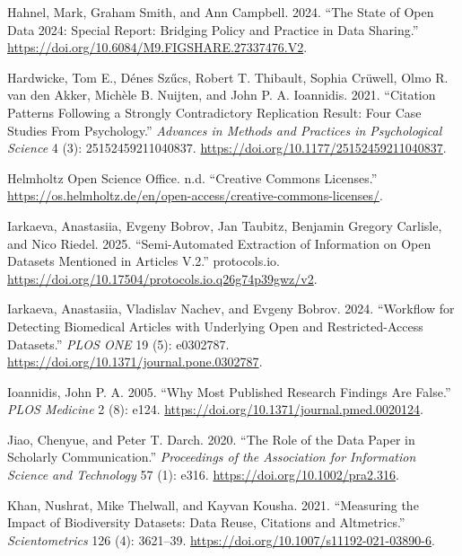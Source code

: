 \documentclass[
  letterpaper,
  DIV=11,
  numbers=noendperiod]{scrartcl}
\newlength{\cslhangindent}
\newenvironment{CSLReferences}[2] %
 {\begin{list}{}{%
  \setlength{\itemindent}{0pt}
  \setlength{\leftmargin}{0pt}
  \setlength{\parsep}{0pt}
  \ifodd #1
   \setlength{\leftmargin}{\cslhangindent}
   \setlength{\itemindent}{-1\cslhangindent}
  \fi
  \setlength{\itemsep}{#2\baselineskip}}}
 {\end{list}}
\begin{document}
\begin{CSLReferences}{1}{0}
Hahnel, Mark, Graham Smith, and Ann Campbell. 2024. {``{The State of
Open Data 2024: Special Report}: Bridging Policy and Practice in Data
Sharing.''} \url{https://doi.org/10.6084/M9.FIGSHARE.27337476.V2}.

Hardwicke, Tom E., Dénes Szűcs, Robert T. Thibault, Sophia Crüwell, Olmo
R. van den Akker, Michèle B. Nuijten, and John P. A. Ioannidis. 2021.
{``Citation {Patterns Following} a {Strongly Contradictory Replication
Result}: {Four Case Studies From Psychology}.''} \emph{Advances in
Methods and Practices in Psychological Science} 4 (3):
25152459211040837. \url{https://doi.org/10.1177/25152459211040837}.

Helmholtz Open Science Office. n.d. {``Creative {Commons Licenses}.''}
\url{https://os.helmholtz.de/en/open-access/creative-commons-licenses/}.

Iarkaeva, Anastasiia, Evgeny Bobrov, Jan Taubitz, Benjamin Gregory
Carlisle, and Nico Riedel. 2025. {``Semi-Automated Extraction of
Information on Open Datasets Mentioned in Articles {V}.2.''}
protocols.io.
\url{https://doi.org/10.17504/protocols.io.q26g74p39gwz/v2}.

Iarkaeva, Anastasiia, Vladislav Nachev, and Evgeny Bobrov. 2024.
{``Workflow for Detecting Biomedical Articles with Underlying Open and
Restricted-Access Datasets.''} \emph{PLOS ONE} 19 (5): e0302787.
\url{https://doi.org/10.1371/journal.pone.0302787}.

Ioannidis, John P. A. 2005. {``Why {Most Published Research Findings Are
False}.''} \emph{PLOS Medicine} 2 (8): e124.
\url{https://doi.org/10.1371/journal.pmed.0020124}.

Jiao, Chenyue, and Peter T. Darch. 2020. {``The Role of the Data Paper
in Scholarly Communication.''} \emph{Proceedings of the Association for
Information Science and Technology} 57 (1): e316.
\url{https://doi.org/10.1002/pra2.316}.

Khan, Nushrat, Mike Thelwall, and Kayvan Kousha. 2021. {``Measuring the
Impact of Biodiversity Datasets: Data Reuse, Citations and
Altmetrics.''} \emph{Scientometrics} 126 (4): 3621--39.
\url{https://doi.org/10.1007/s11192-021-03890-6}.


\end{CSLReferences}
\end{document}
